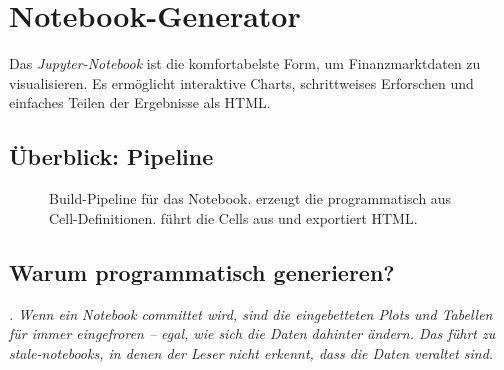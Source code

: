 
\chapter{Notebook-Generator}

\label{ch:notebook}

Das \emph{Jupyter-Notebook} ist die komfortabelste Form, um
Finanzmarktdaten zu visualisieren. Es ermöglicht interaktive
Charts, schrittweises Erforschen und einfaches Teilen der Ergebnisse
als HTML.

\section{Überblick: Pipeline}

\begin{figure}[ht]
\centering
{}
\caption{Build-Pipeline für das Notebook. 
  erzeugt die  programmatisch aus Cell-Definitionen.
   führt die Cells aus und exportiert HTML.}
\label{fig:notebook-pipeline}
\end{figure}

\section{Warum programmatisch generieren?}

\begin{warnung}
\rmfamily\itshape
{}. Wenn ein
Notebook committet wird, sind die eingebetteten Plots und Tabellen
\emph{für immer} eingefroren -- egal, wie sich die Daten dahinter
ändern. Das führt zu \emph{stale-notebooks}, in denen der Leser
nicht erkennt, dass die Daten veraltet sind.
\end{warnung}

